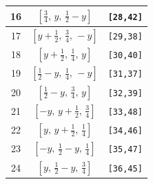 \documentclass[fleqn,8pt]{jsarticle}
\begin{document}
\begin{longtable}{ccc}
16 & $\left[ \frac{3}{4},\, y,\, \frac{1}{2} - y \right]$ & {\tt [28,42]} \\ \hline
17 & $\left[ y + \frac{1}{2},\, \frac{3}{4},\, - y \right]$ & {\tt [29,38]} \\ \hline
18 & $\left[ y + \frac{1}{2},\, \frac{1}{4},\, y \right]$ & {\tt [30,40]} \\ \hline
19 & $\left[ \frac{1}{2} - y,\, \frac{1}{4},\, - y \right]$ & {\tt [31,37]} \\ \hline
20 & $\left[ \frac{1}{2} - y,\, \frac{3}{4},\, y \right]$ & {\tt [32,39]} \\ \hline
21 & $\left[ - y,\, y + \frac{1}{2},\, \frac{3}{4} \right]$ & {\tt [33,48]} \\ \hline
22 & $\left[ y,\, y + \frac{1}{2},\, \frac{1}{4} \right]$ & {\tt [34,46]} \\ \hline
23 & $\left[ - y,\, \frac{1}{2} - y,\, \frac{1}{4} \right]$ & {\tt [35,47]} \\ \hline
24 & $\left[ y,\, \frac{1}{2} - y,\, \frac{3}{4} \right]$ & {\tt [36,45]} \\
\end{longtable}
\renewcommand{\arraystretch}{1.2}
\end{document}
